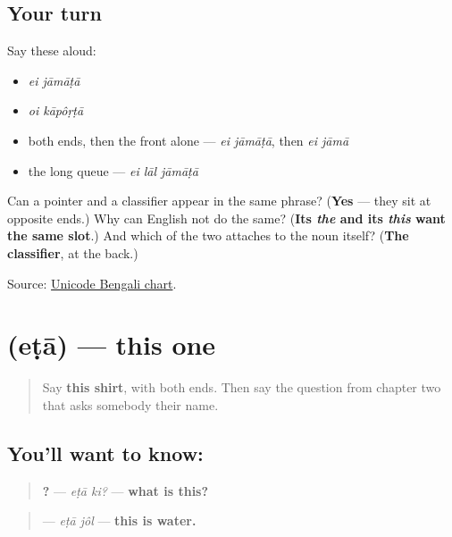 \subsection*{Your turn}
Say these aloud:

\begin{itemize}
\raggedright
  \item \emph{ei jāmāṭā}
  \item \emph{oi kāpôṛṭā}
  \item both ends, then the front alone — \emph{ei jāmāṭā}, then \emph{ei jāmā}
  \item the long queue — \emph{ei lāl jāmāṭā}
\end{itemize}

\begin{tcolorbox}[breakable,colback=teal!4,colframe=teal!35!black,title={Before you move on}]
Can a pointer and a classifier appear in the same phrase? (\textbf{Yes} — they sit at opposite ends.) Why can English not do the same? (\textbf{Its \emph{the} and its \emph{this} want the same slot}.) And which of the two attaches to the noun itself? (\textbf{The classifier}, at the back.)

Source: \href{https://www.unicode.org/charts/PDF/U0980.pdf}{Unicode Bengali chart}.
\end{tcolorbox}
\section[\texorpdfstring{\bn{এটা} (eṭā)}{এটা (eṭā)}]{ (eṭā) — this one}

\label{lesson:BN-C21-eta}



\begin{quote}
Say \textbf{this shirt}, with both ends. Then say the question from chapter two that asks somebody their name.
\end{quote}

\subsection*{You'll want to know: }
\begin{quote}
\textbf{ ?} — \emph{eṭā ki?} — \textbf{what is this?}
\end{quote}

\begin{quote}
\textbf{ } — \emph{eṭā jôl} — \textbf{this is water.}
\end{quote}


